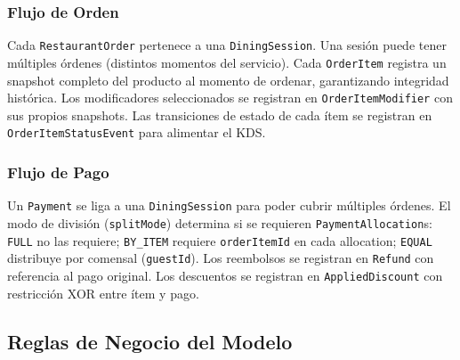 \documentclass[12pt, letterpaper]{article}
\begin{document}
\subsubsection{Flujo de Orden}

Cada \texttt{RestaurantOrder} pertenece a una \texttt{DiningSession}. Una sesión puede tener múltiples órdenes (distintos momentos del servicio). Cada \texttt{OrderItem} registra un snapshot completo del producto al momento de ordenar, garantizando integridad histórica. Los modificadores seleccionados se registran en \texttt{OrderItemModifier} con sus propios snapshots. Las transiciones de estado de cada ítem se registran en \texttt{OrderItemStatusEvent} para alimentar el KDS.

\subsubsection{Flujo de Pago}

Un \texttt{Payment} se liga a una \texttt{DiningSession} para poder cubrir múltiples órdenes. El modo de división (\texttt{splitMode}) determina si se requieren \texttt{PaymentAllocation}s: \texttt{FULL} no las requiere; \texttt{BY\_ITEM} requiere \texttt{orderItemId} en cada allocation; \texttt{EQUAL} distribuye por comensal (\texttt{guestId}). Los reembolsos se registran en \texttt{Refund} con referencia al pago original. Los descuentos se registran en \texttt{AppliedDiscount} con restricción XOR entre ítem y pago.

\subsection{Reglas de Negocio del Modelo}
\end{document}
